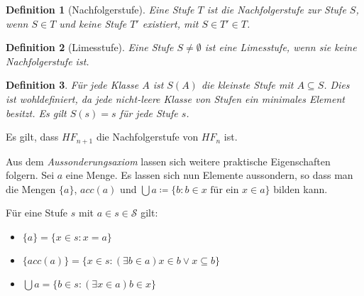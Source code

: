 \documentclass[german]{article}
\theoremstyle{break}
\theoremstyle{def_style}
\newtheorem{definition}{Definition}[section]
\theoremstyle{def_style}
\theoremstyle{lemma_style}
\begin{document}
\begin{definition}[Nachfolgerstufe]
	Eine Stufe $T$ ist die \textit{Nachfolgerstufe} zur Stufe $S$, wenn $S\in T$ und keine Stufe $T'$ existiert, mit $S\in T'\in T$.
\end{definition}

\begin{definition}[Limesstufe]
	Eine Stufe $S\neq \emptyset$ ist eine \textit{Limesstufe}, wenn sie keine Nachfolgerstufe ist.
\end{definition}

\begin{definition}
	Für jede Klasse $A$ ist $S(A)$ die kleinste Stufe mit $A\subseteq S$. Dies ist wohldefiniert, da jede nicht-leere Klasse von Stufen ein minimales Element besitzt. Es gilt $S(s)=s$ für jede Stufe $s$.
\end{definition}

Es gilt, dass $HF_{n+1}$ die Nachfolgerstufe von $HF_n$ ist.

Aus dem \textit{Aussonderungsaxiom} lassen sich weitere praktische Eigenschaften folgern. Sei $a$ eine Menge. Es lassen sich nun Elemente aussondern, so dass man die Mengen $\{a\}$, $acc(a)$ und $\bigcup a\coloneqq\{b : b\in x\text{ für ein } x \in a\}$ bilden kann.

Für eine Stufe $s$ mit $a\in s \in \mathcal{S}$ gilt:
\begin{itemize}
	\item $\{a\}=\{x\in s : x=a\}$
	\item $\{acc(a)\}=\{x\in s: (\exists b\in a)x\in b \lor x\subseteq b\}$
	\item $\bigcup a=\{b\in s : (\exists x\in a)b\in x\}$
\end{itemize}
\end{document}
